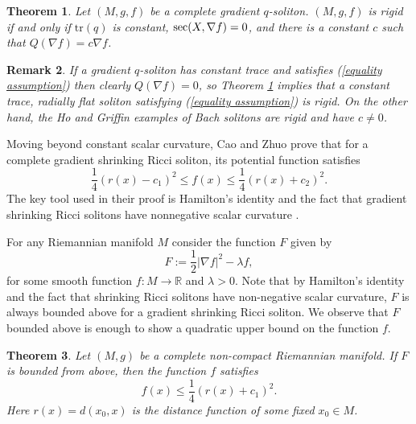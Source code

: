\documentclass{amsart}
\theoremstyle{plain}
\newtheorem{theorem}{\bf Theorem}[section]
\newtheorem{remark}[theorem]{Remark}
\numberwithin{equation}{section}
\begin{document}
\begin{theorem}\label{thm04}
Let $(M,g,f)$ be a complete gradient $q$-soliton.  $(M,g,f)$ is rigid if and only if  $\mathrm{tr}(q)$ is constant, ${\rm sec}(X,\nabla f)=0$,  and there is a constant $c$ such that $Q(\nabla f) = c \nabla f$. 
\end{theorem}

\begin{remark}
{\em 
If a gradient $q$-soliton has constant trace and satisfies (\ref{equality assumption}) then clearly $Q(\nabla f) = 0$, so Theorem \ref{thm04} implies that a constant trace, radially flat soliton satisfying (\ref{equality assumption}) is rigid.  On the other hand, the Ho and Griffin examples of Bach solitons are rigid and have $c \neq 0$. }
\end{remark}

Moving beyond constant scalar curvature,  Cao and Zhuo \cite{Cao-Zhou} prove that for a  complete gradient shrinking Ricci soliton,  its potential function satisfies
$$\frac{1}{4}\left(r(x)-c_1 \right)^{2}\leq f(x)\leq \frac{1}{4}\left(r(x)+c_2 \right)^{2}.$$
The key tool used in their proof is Hamilton's identity and the fact that gradient shrinking Ricci solitons have nonnegative scalar curvature \cite{Chen}.


For any Riemannian manifold $M$ consider the function $F$ given by 
$$F:=\frac{1}{2}|\nabla f|^2-\lambda f,$$
for some smooth function $f:M\to\mathbb{R}$ and $\lambda>0$. Note that by Hamilton's identity and the fact that shrinking Ricci solitons have non-negative scalar curvature, $F$ is always bounded above for a gradient shrinking Ricci soliton. We observe that $F$ bounded above is enough to show a quadratic upper bound on the function $f$. 

\begin{theorem}\label{thm05}
Let $(M,g)$ be a complete non-compact Riemannian manifold. If $F$ is bounded from above, then the function $f$ satisfies
 \begin{equation}
      f(x)\leq \frac{1}{4}\left(r(x)+c_1 \right)^{2}.
 \end{equation}
 Here $r(x)=d(x_0,x)$ is the distance function of some fixed $x_0 \in M$.
\end{theorem}
\end{document}
